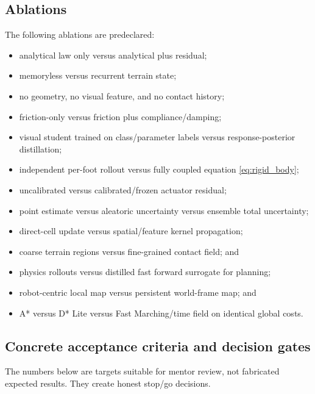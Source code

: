 \subsection{Ablations}

The following ablations are predeclared:
\begin{itemize}
  \item analytical law only versus analytical plus residual;
  \item memoryless versus recurrent terrain state;
  \item no geometry, no visual feature, and no contact history;
  \item friction-only versus friction plus compliance/damping;
  \item visual student trained on class/parameter labels versus response-posterior distillation;
  \item independent per-foot rollout versus fully coupled equation \eqref{eq:rigid_body};
  \item uncalibrated versus calibrated/frozen actuator residual;
  \item point estimate versus aleatoric uncertainty versus ensemble total uncertainty;
  \item direct-cell update versus spatial/feature kernel propagation;
  \item coarse terrain regions versus fine-grained contact field; and
  \item physics rollouts versus distilled fast forward surrogate for planning;
  \item robot-centric local map versus persistent world-frame map; and
  \item A* versus D* Lite versus Fast Marching/time field on identical global costs.
\end{itemize}

\subsection{Concrete acceptance criteria and decision gates}

The numbers below are targets suitable for mentor review, not fabricated expected results. They create honest stop/go decisions.

